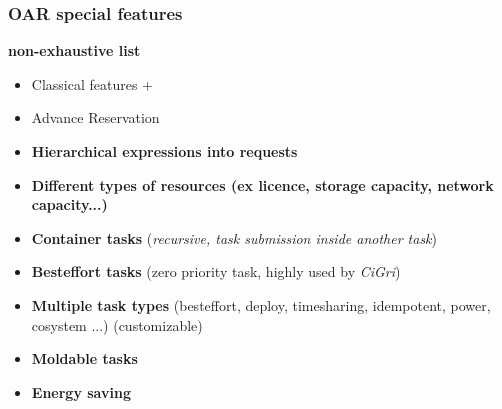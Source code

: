 \documentclass{beamer}
\begin{document}
\begin{frame}
\frametitle{OAR special features}
	{\bf non-exhaustive list}
		\begin{itemize}
    \item Classical features +
    \item Advance Reservation
		\item {\bf Hierarchical expressions into requests }
		\item {\bf Different types of resources (ex licence, storage capacity, network capacity...)  }
		\item {\bf Container tasks} ({\em recursive, task submission inside another task})
		\item {\bf Besteffort tasks} (zero priority task, highly used by {\em CiGri}) 
		\item {\bf Multiple task types} (besteffort, deploy, timesharing, idempotent, power, cosystem ...) (customizable)
    		\item {\bf Moldable tasks}
    		\item {\bf Energy saving}
		
	\end{itemize}
\end{frame}
\end{document}
